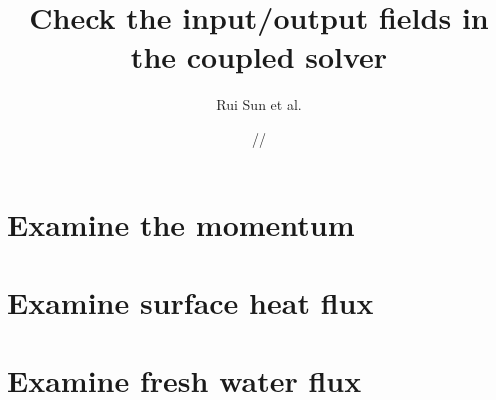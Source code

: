 \documentclass[11pt]{report}
\title{\textbf{Check the input/output fields in the coupled solver}}
\author{Rui Sun et al.}
\date{\oldstylenums{07}/\oldstylenums{01}/\oldstylenums{2018}}
\begin{document}
\maketitle

 
\section{Examine the momentum}



\section{Examine surface heat flux}








\section{Examine fresh water flux}


\end{document}
